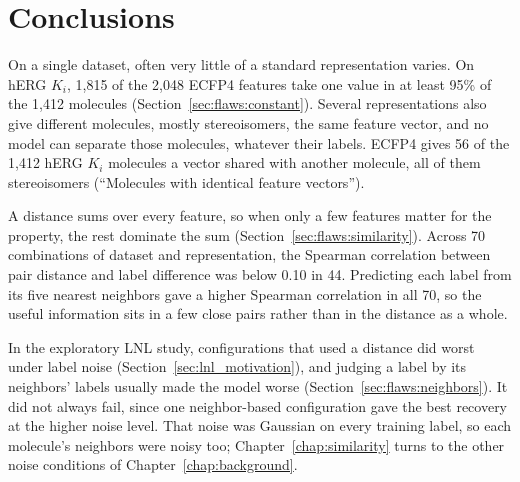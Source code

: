 \section{Conclusions}

On a single dataset, often very little of a standard representation varies. On hERG $K_i$, 1,815 of the 2,048 ECFP4 features take one value in at least 95\% of the 1,412 molecules (Section~\ref{sec:flaws:constant}). Several representations also give different molecules, mostly stereoisomers, the same feature vector, and no model can separate those molecules, whatever their labels. ECFP4 gives 56 of the 1,412 hERG $K_i$ molecules a vector shared with another molecule, all of them stereoisomers (``Molecules with identical feature vectors'').

A distance sums over every feature, so when only a few features matter for the property, the rest dominate the sum (Section~\ref{sec:flaws:similarity}). Across 70 combinations of dataset and representation, the Spearman correlation between pair distance and label difference was below 0.10 in 44. %
Predicting each label from its five nearest neighbors gave a higher Spearman correlation in all 70, so the useful information sits in a few close pairs rather than in the distance as a whole.

In the exploratory LNL study, configurations that used a distance did worst under label noise (Section~\ref{sec:lnl_motivation}), and judging a label by its neighbors' labels usually made the model worse (Section~\ref{sec:flaws:neighbors}). It did not always fail, since one neighbor-based configuration gave the best recovery at the higher noise level. That noise was Gaussian on every training label, so each molecule's neighbors were noisy too; Chapter~\ref{chap:similarity} turns to the other noise conditions of Chapter~\ref{chap:background}.


